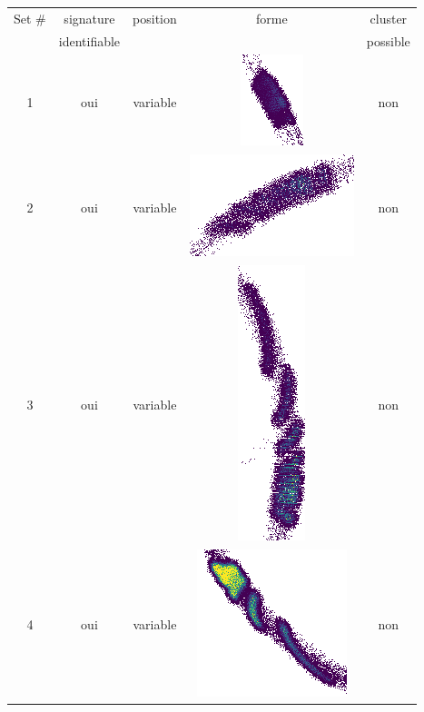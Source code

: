 \begin{table}[h]
\centering
\begin{tabular}{|c|c|c|c|c|}
\hline
Set \# & signature & position & forme & cluster\\
 & identifiable & & & possible\\
\hline
1 & oui & variable & \includegraphics[scale=0.2]{images/set12.png}  & non \\
\hline
2 & oui & variable & \includegraphics[scale=0.2]{images/set13.png}  & non \\
\hline
3 & oui & variable & \includegraphics[scale=0.2]{images/set14.png}  & non \\
\hline
4 & oui & variable & \includegraphics[scale=0.2]{images/set15.png}  & non \\

\end{tabular}
\end{table}
